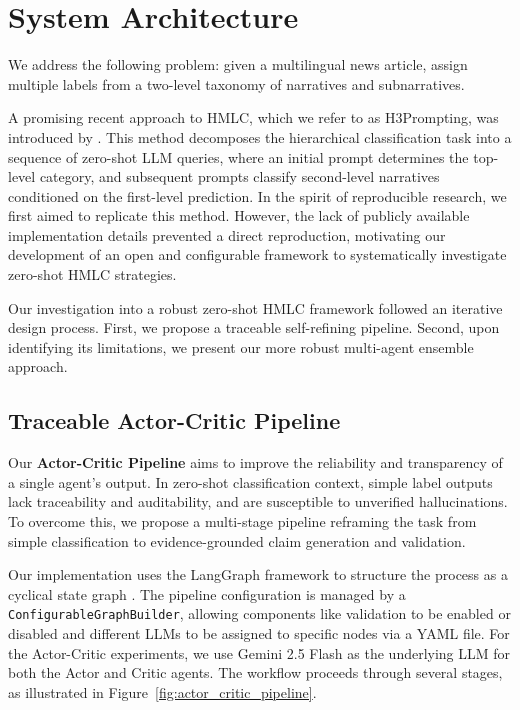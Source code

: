 \section{System Architecture}
We address the following problem: given a multilingual news article, assign multiple labels from a two-level taxonomy of narratives and subnarratives.

A promising recent approach to HMLC, which we refer to as H3Prompting, was introduced by \citet{singh-etal-2025-gatenlp}. 
This method decomposes the hierarchical classification task into a sequence of zero-shot LLM queries, where an initial prompt determines the top-level category, and subsequent prompts classify second-level narratives conditioned on the first-level prediction. 
In the spirit of reproducible research, we first aimed to replicate this method. 
However, the lack of publicly available implementation details prevented a direct reproduction, motivating our development of an open and configurable framework to systematically investigate zero-shot HMLC strategies.

Our investigation into a robust zero-shot HMLC framework followed an iterative design process. 
First, we propose a traceable self-refining pipeline. Second, upon identifying its limitations, we present our more robust multi-agent ensemble approach.




\subsection{Traceable Actor-Critic Pipeline}

Our \textbf{Actor-Critic Pipeline} aims to improve the reliability and transparency of a single agent's output. 
In zero-shot classification context, simple label outputs lack traceability and auditability, and are susceptible to unverified hallucinations. To overcome this, we propose a multi-stage pipeline reframing the task from simple classification to evidence-grounded claim generation and validation.

Our implementation uses the LangGraph framework to structure the process as a cyclical state graph \citep{langgraph2024}. The pipeline configuration is managed by a \texttt{ConfigurableGraphBuilder}, allowing components like validation to be enabled or disabled and different LLMs to be assigned to specific nodes via a YAML file. For the Actor-Critic experiments, we use Gemini 2.5 Flash as the underlying LLM for both the Actor and Critic agents. The workflow proceeds through several stages, as illustrated in Figure~\ref{fig:actor_critic_pipeline}.


